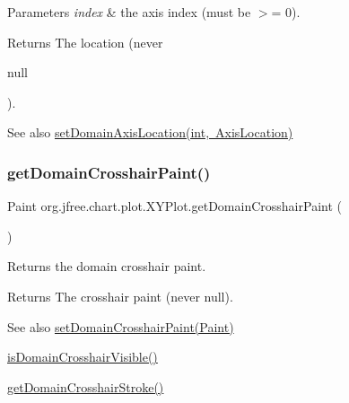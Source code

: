 \begin{DoxyParams}{Parameters}
{\em index} & the axis index (must be $>$= 0).\\
\hline
\end{DoxyParams}
\begin{DoxyReturn}{Returns}
The location (never
\begin{DoxyCode}
null 
\end{DoxyCode}
 ).
\end{DoxyReturn}
\begin{DoxySeeAlso}{See also}
\mbox{\hyperlink{classorg_1_1jfree_1_1chart_1_1plot_1_1_x_y_plot_a67b3006bc00270da79f919e2970523c0}{set\+Domain\+Axis\+Location(int, Axis\+Location)}} 
\end{DoxySeeAlso}
\mbox{\label{classorg_1_1jfree_1_1chart_1_1plot_1_1_x_y_plot_a43a34d17324643826f1b1587e73fb38a}} 
\subsubsection{\texorpdfstring{get\+Domain\+Crosshair\+Paint()}{getDomainCrosshairPaint()}}
{\footnotesize\ttfamily Paint org.\+jfree.\+chart.\+plot.\+X\+Y\+Plot.\+get\+Domain\+Crosshair\+Paint (\begin{DoxyParamCaption}{ }\end{DoxyParamCaption})}

Returns the domain crosshair paint.

\begin{DoxyReturn}{Returns}
The crosshair paint (never {\ttfamily null}).
\end{DoxyReturn}
\begin{DoxySeeAlso}{See also}
\mbox{\hyperlink{classorg_1_1jfree_1_1chart_1_1plot_1_1_x_y_plot_a7b47895577fbe1e7194037629f93b7e8}{set\+Domain\+Crosshair\+Paint(\+Paint)}} 

\mbox{\hyperlink{classorg_1_1jfree_1_1chart_1_1plot_1_1_x_y_plot_ae1fc992f5b9f115943993c300b669c8d}{is\+Domain\+Crosshair\+Visible()}} 

\mbox{\hyperlink{classorg_1_1jfree_1_1chart_1_1plot_1_1_x_y_plot_a764aae9df73c20a28fc79cede021d9e2}{get\+Domain\+Crosshair\+Stroke()}} 
\end{DoxySeeAlso}
\mbox{\label{classorg_1_1jfree_1_1chart_1_1plot_1_1_x_y_plot_a764aae9df73c20a28fc79cede021d9e2}} 
